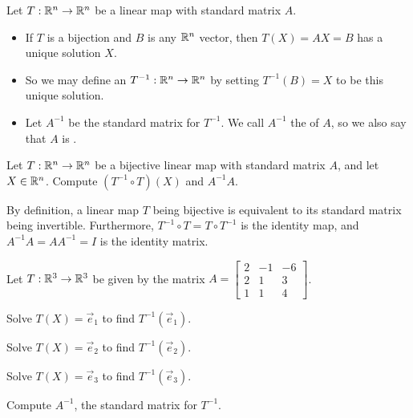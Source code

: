 
\begin{applicationActivities}{3}{23}

\begin{definition}
  Let $T: \mathbb{R}^n \rightarrow \mathbb{R}^n$ be a linear map with standard matrix $A$.
\begin{itemize}
\item  If $T$ is a bijection and $B$ is any $\mathbb{R}^n$ vector, then $T(X)=AX=B$ has a unique solution $X$.
\item So we may define an  $T^{-1} : \mathbb{R}^n \rightarrow \mathbb{R}^n$ by setting $T^{-1}(B)=X$ to be this unique solution.
\item Let $A^{-1}$ be the standard matrix for $T^{-1}$. We call $A^{-1}$ the
 of $A$, so we also say that $A$ is .
\end{itemize}
\end{definition}

\begin{activity}{5}
  Let \(T:\mathbb{R}^n\to\mathbb{R}^n\) be a bijective linear map with standard matrix $A$,
  and let \(X\in\mathbb{R}^n\). Compute \((T^{-1}\circ T)(X)\)
  and \(A^{-1}A\).
\end{activity}

\begin{observation}
  By definition, a linear map \(T\) being bijective is equivalent to
  its standard matrix being invertible. Furthermore,
  \(T^{-1}\circ T=T\circ T^{-1}\) is the identity map, and
  \(A^{-1}A=AA^{-1}=I\) is the identity matrix.
\end{observation}


\begin{activity}{25}
  Let \(T: \mathbb{R}^3 \rightarrow \mathbb{R}^3\) be given by the matrix
  \(A=\begin{bmatrix} 2 & -1 & -6 \\ 2 & 1 & 3 \\ 1 & 1 & 4 \end{bmatrix}\).
  \begin{subactivity}
  Solve $T(X)=\vec{e}_1$ to find $T^{-1}(\vec{e}_1)$.
  \end{subactivity}
  \begin{subactivity}
   Solve $T(X)=\vec{e}_2$ to find $T^{-1}(\vec{e}_2)$.
  \end{subactivity}
  \begin{subactivity}
   Solve $T(X)=\vec{e}_3$ to find $T^{-1}(\vec{e}_3)$.
  \end{subactivity}
  \begin{subactivity}
  Compute $A^{-1}$, the standard matrix for $T^{-1}$.
  \end{subactivity}
\end{activity}


\end{applicationActivities}
